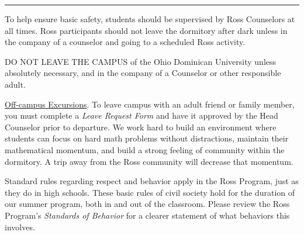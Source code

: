 \documentclass{ross}
\begin{document}
\bigskip\hrule
\pagebreak

To help ensure basic safety, students should be supervised 
by Ross Counselors at all times.
Ross participants should not leave the dormitory after dark unless 
in the company of a counselor and going to a scheduled Ross activity.

DO NOT LEAVE THE CAMPUS of the Ohio Dominican University unless \\
absolutely necessary, and in the company of a Counselor or other responsible adult.  

\underline{Off-campus Excursions}.  To leave campus with
an adult friend or family member, you must complete a {\it Leave Request Form} 
and have it approved by the Head Counselor prior to departure.
We work hard to build an environment where students can focus on hard math problems
without distractions, maintain their mathematical momentum,
 and build a strong feeling of community within the dormitory.  
 A trip away from the Ross community will decrease that momentum.

\bigskip

Standard rules regarding respect and behavior apply in the Ross
Program, just as they do in high schools. These basic rules of civil society hold 
for the duration of our summer program, both in and out of the classroom. 
Please review the Ross Program's \textit{Standards of Behavior} for
a clearer statement of what behaviors this involves.
\end{document}
